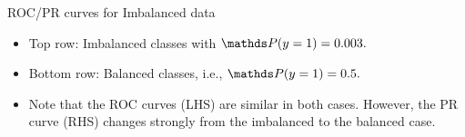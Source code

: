 	
	\begin{vbframe}{ROC/PR curves for Imbalanced data}

			
			\small
			\vspace{-0.2cm}
			\begin{itemize}
				\item Top row: Imbalanced classes with $\P(y=1) = 0.003.$
				\item Bottom row: Balanced classes, i.e., $\P(y=1) = 0.5.$
				\item Note that the ROC curves (LHS) are similar in both cases. However, the PR curve (RHS) changes strongly from the imbalanced to the balanced case.
			\end{itemize}
			
		
		

\end{vbframe}
